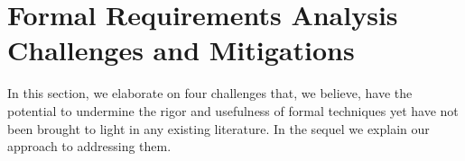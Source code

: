 \section{Formal Requirements Analysis Challenges and Mitigations}
\label{sec:challenge}

In this section, we elaborate on four challenges that, we believe, have the potential to undermine the rigor and usefulness of formal techniques yet have not been brought to light in any existing literature. In the sequel we explain our approach to addressing them.



